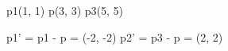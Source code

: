        p1(1, 1) 
       p(3, 3)
       p3(5, 5)

       p1' = p1 - p = (-2, -2)
       p2' = p3 - p = (2, 2)
       
       

